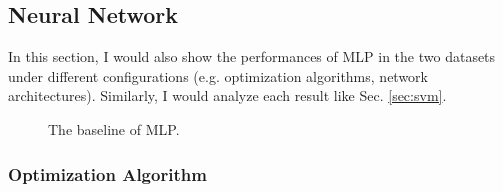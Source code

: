 \documentclass[12pt,a4paper]{article}
\theoremstyle{definition}
\begin{document}
\subsection{Neural Network}

In this section, I would also show the performances of MLP in the two datasets under different configurations (e.g. optimization algorithms, network architectures). Similarly, I would analyze each result like Sec. \ref{sec:svm}.

\begin{figure}[H]
	\centering
	\caption{The baseline of MLP.}
	\label{fig:mlp-baseline}
\end{figure}

\subsubsection{Optimization Algorithm}
\end{document}
